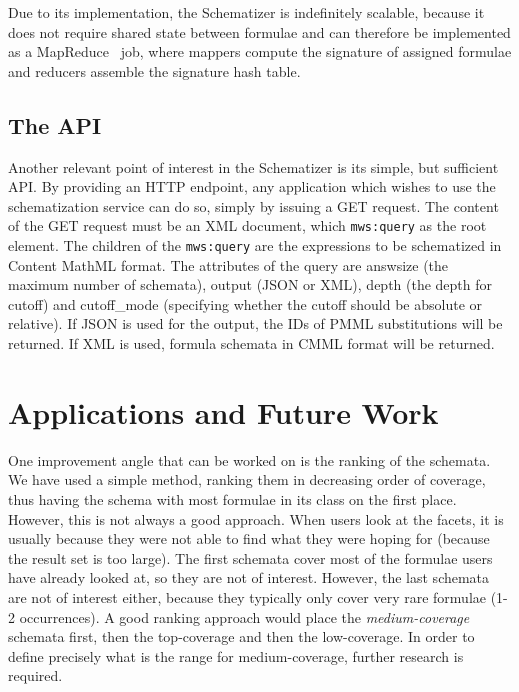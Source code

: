 \documentclass[a4paper,oneside]{article}
\def\cmml{\textsf{Content MathML}\xspace}
\def\xml{\textsf{XML}\xspace}
\begin{document}
Due to its implementation, the Schematizer is indefinitely scalable, because it
does not require shared state between formulae and can therefore be implemented
as a MapReduce~\cite{mapreduce} job, where mappers compute the signature of
assigned formulae and reducers assemble the signature hash table.

\subsection{The API}\label{subsec:schematizer_api}
Another relevant point of interest in the Schematizer is its simple, but
sufficient API. By providing an HTTP endpoint, any application which wishes to
use the schematization service can do so, simply by issuing a GET request.
The content of the GET request must be an \xml document, which \verb|mws:query|
as the root element. The children of the \verb|mws:query| are the expressions
to be schematized in \cmml format. The attributes of the query are
\textsf{answsize} (the maximum number of schemata), \textsf{output} (JSON or
XML), \textsf{depth} (the depth for cutoff) and \textsf{cutoff\_mode}
(specifying whether the cutoff should be absolute or relative).  If JSON is
used for the output, the IDs of PMML substitutions will be returned. If XML is
used, formula schemata in CMML format will be returned.

\section{Applications and Future Work}\label{sec:future}
One improvement angle that can be worked on is the ranking of the schemata.
We have used a simple method, ranking them in decreasing order of coverage,
thus having the schema with most formulae in its class on the first place.
However, this is not always a good approach. When users look at the facets,
it is usually because they were not able to find what they were hoping for
(because the result set is too large). The first schemata cover most of the
formulae users have already looked at, so they are not of interest.
However, the last schemata are not of interest either, because they typically
only cover very rare formulae (1-2 occurrences). A good ranking approach would
place the \textit{medium-coverage} schemata first, then the top-coverage and
then the low-coverage. In order to define precisely what is the range for
medium-coverage, further research is required.
\end{document}
